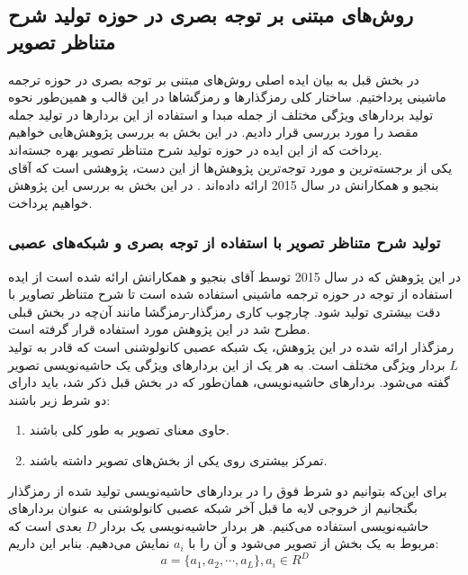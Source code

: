 \subsection{روش‌های مبتنی بر توجه بصری در حوزه تولید شرح متناظر تصویر}
در بخش قبل به بیان ایده اصلی روش‌های مبتنی بر توجه بصری در حوزه ترجمه ماشینی پرداختیم. ساختار کلی رمزگذارها و رمزگشاها در این قالب و همین‌طور نحوه تولید بردارهای ویژگی مختلف از جمله مبدا و استفاده از این بردارها در تولید جمله مقصد را مورد بررسی قرار دادیم. در این بخش  به بررسی پژوهش‌هایی خواهیم پرداخت که از این ایده در حوزه تولید شرح متناظر تصویر بهره‌ جسته‌اند.
\\
یکی از برجسته‌ترین و مورد توجه‌ترین پژوهش‌ها از این دست، پژوهشی است که آقای بنجیو و همکارانش در سال 2015 ارائه داده‌اند
\cite{xu2015show}.
در این بخش به بررسی این پژوهش خواهیم پرداخت.

\subsubsection[تولید شرح متناظر تصویر با استفاده از توجه بصری و شبکه‌های عصبی]{تولید شرح متناظر تصویر با استفاده از توجه بصری و شبکه‌های عصبی \cite{xu2015show}}

در این پژوهش که در سال 2015 توسط آقای بنجیو و همکارانش ارائه شده است از ایده استفاده از توجه در حوزه ترجمه ماشینی استفاده شده است تا شرح متناظر تصاویر با دقت بیشتری تولید شود. چارچوب کاری رمزگذار-رمزگشا مانند آن‌چه در بخش قبلی مطرح شد در این پژوهش مورد استفاده قرار گرفته است.
\\
رمزگذار ارائه شده در این پژوهش، یک شبکه عصبی کانولوشنی است که قادر به تولید $L$ بردار ویژگی مختلف است. به هر یک از این بردارهای ویژگی یک حاشیه‌نویسی تصویر گفته می‌شود. بردارهای حاشیه‌نویسی، همان‌طور که در بخش قبل ذکر شد، باید دارای دو شرط زیر باشند:
\begin{enumerate}
	\item حاوی معنای تصویر به طور کلی باشند.
	\item تمرکز بیشتری روی یکی از بخش‌های تصویر داشته باشند.
\end{enumerate}
برای این‌که بتوانیم دو شرط فوق را در بردارهای حاشیه‌نویسی تولید شده از رمزگذار بگنجانیم از خروجی لایه ما قبل آخر شبکه عصبی کانولوشنی به عنوان بردارهای حاشیه‌نویسی استفاده می‌کنیم. هر بردار حاشیه‌نویسی یک بردار $D$ بعدی است که مربوط به یک بخش از تصویر می‌شود و آن را با $a_i$ نمایش می‌دهیم. بنابر این داریم:
\begin{equation}
a = \{a_1, a_2, \cdots, a_L\}, a_i \in R^D
\end{equation}

